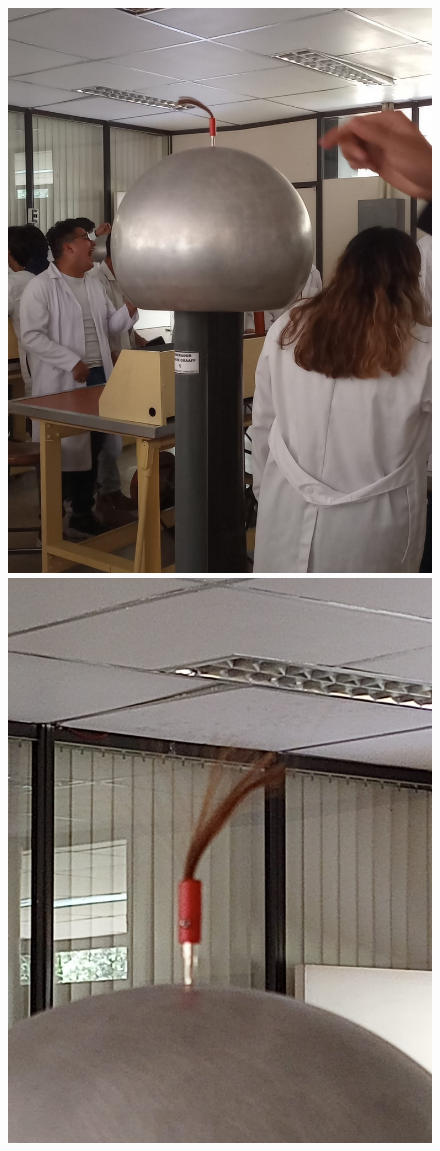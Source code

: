 \documentclass[10pt]{article}
\begin{document}
\begin{multicols}{2}
\begin{figure}[h]
\centering
\includegraphics[scale=0.07]{p15}
\includegraphics[scale=0.07]{p16}

\end{figure}
\end{multicols}
\end{document}
